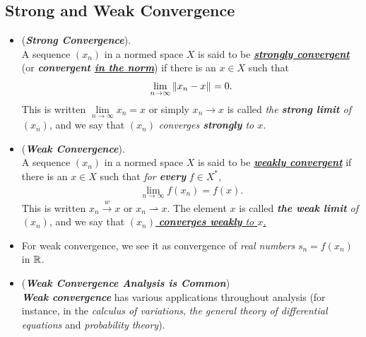 \documentclass[11pt]{article}
\begin{document}
\subsection{Strong and Weak Convergence}
\begin{itemize}
\item \begin{definition} (\emph{\textbf{Strong Convergence}}). \citep{kreyszig1989introductory}\\
A sequence $(x_n)$ in a normed space $X$ is said to be \underline{\emph{\textbf{strongly convergent}}} (or \emph{\textbf{convergent \underline{in the norm}}}) if
there is  an $x \in X$ such that
\begin{align*}
\lim\limits_{n\rightarrow \infty} \left\|x_n - x\right\|_{} = 0.
\end{align*}
This is written $\lim\limits_{n\rightarrow \infty}x_n = x$ or simply $x_n \rightarrow x$ is called \emph{the \textbf{strong limit} of $(x_n)$}, and we say that $(x_n)$ \emph{converges \textbf{strongly} to $x$}. 
\end{definition}

\item \begin{definition} (\emph{\textbf{Weak Convergence}}). \citep{kreyszig1989introductory}\\
A sequence $(x_n)$ in a normed space $X$ is said to be \underline{\emph{\textbf{weakly convergent}}} if there is an $x \in X$ such that \emph{for \textbf{every}} $f \in X^{*}$,
\begin{align*}
\lim\limits_{n\rightarrow \infty} f(x_n) = f(x).
\end{align*}
This is written $x_n \stackrel{w}{\rightarrow} x$ or $x_n \rightharpoonup x$. The element $x$ is called \emph{\textbf{the weak limit} of $(x_n)$}, and we say
that \underline{$(x_n)$ \emph{\textbf{converges weakly} to $x$.}}
\end{definition}

\item \begin{remark}
For weak convergence, we see it as convergence of \emph{real numbers} $s_n = f(x_n)$ in ${\mathbb R}$.
\end{remark}

\item \begin{remark} (\emph{\textbf{Weak Convergence Analysis is Common}})\\
\emph{\textbf{Weak convergence}} has various applications throughout analysis (for instance, in the \emph{calculus of variations}, \emph{the general theory of
differential equations} and \emph{probability theory}). 


\end{remark}
\end{itemize}
\end{document}
